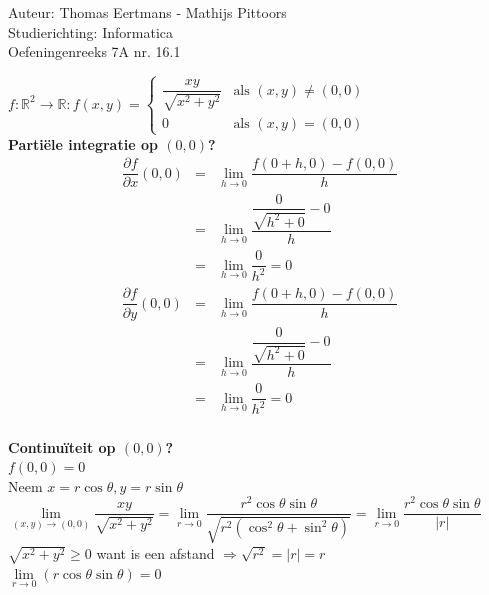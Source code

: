 \documentclass[a4paper]{article}
\newcommand{\llim}{\lim\limits}
\newcommand{\pa}[1]{\dfrac{\partial f}{\partial #1}}
\begin{document}
  
\noindent \large Auteur: Thomas Eertmans - Mathijs Pittoors \\
\noindent \large Studierichting: Informatica\\
\noindent \large Oefeningenreeks 7A nr. 16.1\\

\medskip

\normalsize

$f: \mathbb{R}^2 \to \mathbb{R}:
f(x,y) = \left\{
\begin{array}{ll}
	\dfrac{xy}{\sqrt{x^2 + y^2}} & \text{als } (x,y) \neq (0,0) \\
	0 & \text{als } (x,y) = (0,0)
\end{array}
\right.$\\

\textbf{Partiële integratie op $(0,0)$?}\\

\begin{eqnarray*}
	\pa{x} (0,0) & = & \llim_{h \to 0} \dfrac{f(0+h,0)-f(0,0)}{h}\\
		& = & \llim_{h \to 0} \dfrac{\dfrac{0}{\sqrt{h^2+0}}-0}{h}\\
		& = & \llim_{h \to 0} \dfrac{0}{h^2} = 0\\
	\pa{y} (0,0) & = & \llim_{h \to 0} \dfrac{f(0+h,0)-f(0,0)}{h}\\
		& = & \llim_{h \to 0} \dfrac{\dfrac{0}{\sqrt{h^2+0}}-0}{h}\\
		& = & \llim_{h \to 0} \dfrac{0}{h^2} = 0\\
\end{eqnarray*}

\textbf{Continuïteit op $(0,0)$?}\\

$f(0,0) = 0$\\



Neem $ x = r \cos\theta, y = r \sin \theta$\\

$\llim_{(x,y) \to (0,0)} \dfrac{xy}{\sqrt{x^2+y^2}} = \llim_{r \to 0} \dfrac{r^2 \cos\theta\sin\theta}{\sqrt{r^2(\cos^2\theta+\sin^2\theta)}} = \llim_{r \to 0} \dfrac{r^2 \cos\theta \sin\theta}{|r|}$\\

$\sqrt{x^2+y^2} \ge 0$ want is een afstand $ \Rightarrow \sqrt{r^2} = |r| = r$\\

$\llim_{r \to 0} (r \cos\theta \sin\theta) = 0$\\
\end{document}
